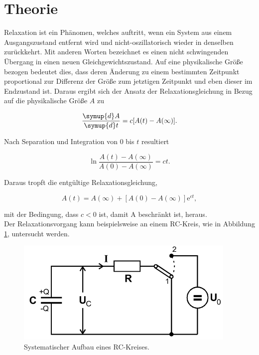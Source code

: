 \section{Theorie}
\label{sec:Theorie}
Relaxation ist ein Phänomen, welches auftritt, wenn ein System aus einem Ausgangszustand entfernt wird und nicht-oszillatorisch wieder in denselben zurückkehrt.
Mit anderen Worten bezeichnet es einen nicht schwingenden Übergang in einen neuen Gleichgewichtszustand.
Auf eine physikalische Größe bezogen bedeutet dies, dass deren Änderung zu einem bestimmten Zeitpunkt proportional zur Differenz der Größe zum jetztigen Zeitpunkt und eben dieser im Endzustand ist.
Daraus ergibt sich der Ansatz der Relaxationsgleichung in Bezug auf die physikalische Größe $A$ zu

\begin{equation}
 \frac{\symup{d} A}{\symup{d} t} = c [A(t) - A(\infty)].
\end{equation}

Nach Separation und Integration von $0$ bis $t$ resultiert

\begin{equation}
 \ln\frac{A(t)-A(\infty)}{A(0)-A(\infty)} = ct.
\end{equation}

Daraus tropft die entgültige Relaxationsgleichung,

\begin{equation}
  A(t) = A(\infty) + [A(0) - A(\infty)] \mathrm{e}^{ct}, \label{eqn:gl}
\end{equation}

mit der Bedingung, dass $c<0$ ist, damit A beschränkt ist, heraus.\\
Der Relaxationsvorgang kann beispielsweise an einem RC-Kreis, wie in Abbildung \ref{fig:1}, untersucht werden.

\begin{figure}[H]
  \centering
  \includegraphics[height=5cm]{kreis.png}
  \caption{Systematischer Aufbau eines RC-Kreises. \cite{sample}}
  \label{fig:1}
\end{figure}

